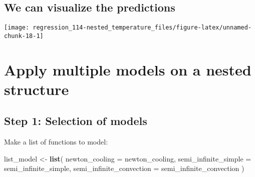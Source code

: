 \documentclass[]{book}
\newenvironment{Shaded}{\begin{snugshade}}{\end{snugshade}}
\newcommand{\DataTypeTok}[1]{\textcolor[rgb]{0.13,0.29,0.53}{#1}}
\newcommand{\KeywordTok}[1]{\textcolor[rgb]{0.13,0.29,0.53}{\textbf{#1}}}
\newcommand{\NormalTok}[1]{#1}
\newcommand{\OperatorTok}[1]{\textcolor[rgb]{0.81,0.36,0.00}{\textbf{#1}}}
\newcommand{\StringTok}[1]{\textcolor[rgb]{0.31,0.60,0.02}{#1}}
\begin{document}
\hypertarget{we-can-visualize-the-predictions}{%
\subsection{We can visualize the predictions}\label{we-can-visualize-the-predictions}}

\begin{Shaded}
\end{Shaded}

\begin{center}\texttt{[image: regression\_114-nested\_temperature\_files/figure-latex/unnamed-chunk-18-1]} \end{center}

\hypertarget{apply-multiple-models-on-a-nested-structure}{%
\section{Apply multiple models on a nested structure}\label{apply-multiple-models-on-a-nested-structure}}

\hypertarget{step-1-selection-of-models}{%
\subsection{Step 1: Selection of models}\label{step-1-selection-of-models}}

Make a list of functions to model:

\begin{Shaded}
\begin{Highlighting}[]
\NormalTok{list_model <-}
\StringTok{  }\KeywordTok{list}\NormalTok{(}
    \DataTypeTok{newton_cooling =}\NormalTok{ newton_cooling,}
    \DataTypeTok{semi_infinite_simple =}\NormalTok{ semi_infinite_simple,}
    \DataTypeTok{semi_infinite_convection =}\NormalTok{ semi_infinite_convection}
\NormalTok{  )}
\end{Highlighting}
\end{Shaded}
\end{document}
